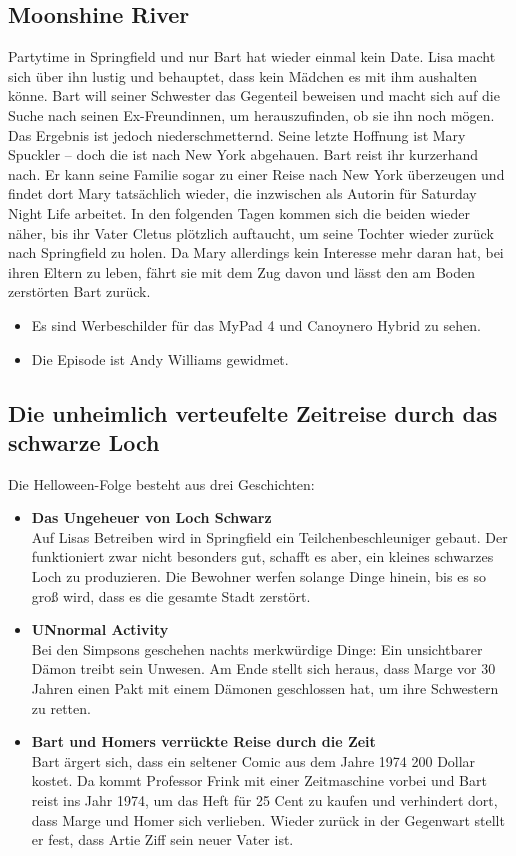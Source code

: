 \subsection{Moonshine River}
Partytime in Springfield und nur Bart hat wieder einmal kein Date. Lisa macht sich über ihn lustig und behauptet, dass kein Mädchen es mit ihm aushalten könne. Bart will seiner Schwester das Gegenteil beweisen und macht sich auf die Suche nach seinen Ex-Freundinnen, um herauszufinden, ob sie ihn noch mögen. Das Ergebnis ist jedoch niederschmetternd. Seine letzte Hoffnung ist Mary Spuckler -- doch die ist nach New York abgehauen. Bart reist ihr kurzerhand nach.  Er kann seine Familie sogar zu einer Reise nach New York überzeugen und findet dort Mary tatsächlich wieder, die inzwischen als Autorin für Saturday Night Life arbeitet. In den folgenden Tagen kommen sich die beiden wieder näher, bis ihr Vater Cletus plötzlich auftaucht, um seine Tochter wieder zurück nach Springfield zu holen. Da Mary allerdings kein Interesse mehr daran hat, bei ihren Eltern zu leben, fährt sie mit dem Zug davon und lässt den am Boden zerstörten Bart zurück.

\begin{itemize}
  \item Es sind Werbeschilder für das MyPad 4 und Canoynero Hybrid zu sehen.
	\item Die Episode ist Andy Williams gewidmet.
\end{itemize}

\subsection{Die unheimlich verteufelte Zeitreise durch das schwarze Loch}
Die Helloween-Folge besteht aus drei Geschichten:
\begin{itemize}
	\item \textbf{Das Ungeheuer von Loch Schwarz}\\ Auf Lisas Betreiben wird in Springfield ein Teilchenbeschleuniger gebaut. Der funktioniert zwar nicht besonders gut, schafft es aber, ein kleines schwarzes Loch zu produzieren. Die Bewohner werfen solange Dinge hinein, bis es so groß wird, dass es die gesamte Stadt zerstört.
	\item \textbf{UNnormal Activity}\\ Bei den Simpsons geschehen nachts merkwürdige Dinge: Ein unsichtbarer Dämon treibt sein Unwesen. Am Ende stellt sich heraus, dass Marge vor 30 Jahren einen Pakt mit einem Dämonen geschlossen hat, um ihre Schwestern zu retten.
	\item \textbf{Bart und Homers verrückte Reise durch die Zeit}\\ Bart ärgert sich, dass ein seltener Comic aus dem Jahre 1974 200 Dollar kostet. Da kommt Professor Frink mit einer Zeitmaschine vorbei und Bart reist ins Jahr 1974, um das Heft für 25 Cent zu kaufen und verhindert dort, dass Marge und Homer sich verlieben. Wieder zurück in der Gegenwart stellt er fest, dass Artie Ziff sein neuer Vater ist. 
\end{itemize}

